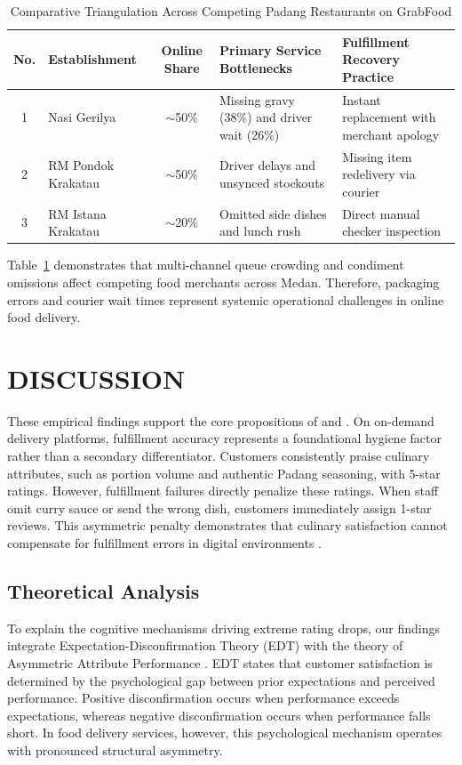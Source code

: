 \documentclass{jomas}
\begin{document}
\begin{table}[H]
\caption{Comparative Triangulation Across Competing Padang Restaurants on GrabFood}
\label{tab:competitor-comparison}
\centering
\small
\setlength{\tabcolsep}{5pt}
\begin{tabularx}{\textwidth}{c l c p{5.5cm} X}
\toprule
\textbf{No.} & \textbf{Establishment} & \textbf{Online Share} & \textbf{Primary Service Bottlenecks} & \textbf{Fulfillment Recovery Practice} \\
\midrule
1 & Nasi Gerilya & $\sim$50\% & Missing gravy (38\%) and driver wait (26\%) & Instant replacement with merchant apology \\
2 & RM Pondok Krakatau & $\sim$50\% & Driver delays and unsynced stockouts & Missing item redelivery via courier \\
3 & RM Istana Krakatau & $\sim$20\% & Omitted side dishes and lunch rush & Direct manual checker inspection \\
\bottomrule
\end{tabularx}
\end{table}

Table~\ref{tab:competitor-comparison} demonstrates that multi-channel queue crowding and condiment omissions affect competing food merchants across Medan. Therefore, packaging errors and courier wait times represent systemic operational challenges in online food delivery.

\section{DISCUSSION}
These empirical findings support the core propositions of \textcite{parasuraman2005esqual} and \textcite{wirtz2024servicesmarketing}. On on-demand delivery platforms, fulfillment accuracy represents a foundational hygiene factor rather than a secondary differentiator. Customers consistently praise culinary attributes, such as portion volume and authentic Padang seasoning, with 5-star ratings. However, fulfillment failures directly penalize these ratings. When staff omit curry sauce or send the wrong dish, customers immediately assign 1-star reviews. This asymmetric penalty demonstrates that culinary satisfaction cannot compensate for fulfillment errors in digital environments \parencite{santoso2023esatisfaction}.

\subsection{Theoretical Analysis}
To explain the cognitive mechanisms driving extreme rating drops, our findings integrate Expectation-Disconfirmation Theory (EDT) \parencite{oliver1980cognition} with the theory of Asymmetric Attribute Performance \parencite{mittal1998asymmetric,anderson1993satisfaction}. EDT states that customer satisfaction is determined by the psychological gap between prior expectations and perceived performance. Positive disconfirmation occurs when performance exceeds expectations, whereas negative disconfirmation occurs when performance falls short. In food delivery services, however, this psychological mechanism operates with pronounced structural asymmetry.
\end{document}
